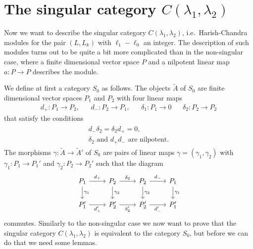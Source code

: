 \section{\texorpdfstring{The singular category $C(\lambda_1,\lambda_2)$}{The singular category C(lambda\_1,lambda\_2)}}

Now we want to describe the singular category $C(\lambda_1,\lambda_2)$, i.e.\ Harish-Chandra modules for the pair $(L,L_k)$ with $\ell_1-\ell_0$ an integer. The description of such modules turns out to be quite a bit more complicated than in the non-singular case, where a finite dimensional vector space $P$ and a nilpotent linear map $a\colon P\to P$ describes the module.

We define at first a category $S_0$ as follows. The objects $\widetilde{A}$ of $S_0$ are finite dimensional vector spaces $P_1$ and $P_2$ with four linear maps
\begin{align}
  d_+ \colon P_1\to P_2, && d_- \colon P_2\to P_1, && \delta_1\colon P_1\to 0 && \delta_2\colon P_2\to P_2
\end{align}
that satisfy the conditions
\begin{align}
  \begin{aligned}
    d_-\delta_2 = \delta_2d_+ = 0, \\
    \delta_2 \text{ and } d_+d_- \text{ are nilpotent.}
  \end{aligned}
\end{align}
The morphisms $\gamma\colon \widetilde{A}\to \widetilde{A}'$ of $S_0$ are pairs of linear maps $\gamma=(\gamma_1,\gamma_2)$ with $\gamma_1\colon P_1\to P_1'$ and $\gamma_2\colon P_2\to P_2'$ such that the diagram
\begin{equation}\label{eq:S0diagram}
  \begin{tikzcd}
    P_1 \ar[d,"\gamma_1"] \ar[r,"d_+"] & P_2 \ar[d,"\gamma_2"] \ar[r,"\delta_2"] & P_2 \ar[d,"\gamma_2"] \ar[r,"d_-"] & P_1 \ar[d,"\gamma_1"] \\
    P_1' \ar[r,"d_+'",swap] & P_2' \ar[r,"\delta_2'",swap] & P_2' \ar[r,"d_-'",swap] & P_1'
  \end{tikzcd}
\end{equation}
commutes. Similarly to the non-singular case we now want to prove that the singular category $C(\lambda_1,\lambda_2)$ is equivalent to the category $S_0$, but before we can do that we need some lemmas.

